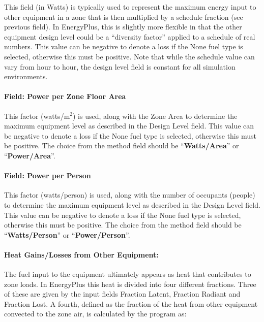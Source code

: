 This field (in Watts) is typically used to represent the maximum energy input to other equipment in a zone that is then multiplied by a schedule fraction (see previous field). In EnergyPlus, this is slightly more flexible in that the other equipment design level could be a ``diversity factor'' applied to a schedule of real numbers. This value can be negative to denote a loss if the None fuel type is selected, otherwise this must be positive. Note that while the schedule value can vary from hour to hour, the design level field is constant for all simulation environments.

\paragraph{Field: Power per Zone Floor Area}\label{field-power-per-zone-floor-area-3}

This factor (watts/m\(^{2}\)) is used, along with the Zone Area to determine the maximum equipment level as described in the Design Level field. This value can be negative to denote a loss if the None fuel type is selected, otherwise this must be positive. The choice from the method field should be ``\textbf{Watts/Area}'' or ``\textbf{Power/Area}''.

\paragraph{Field: Power per Person}\label{field-power-per-person-3}

This factor (watts/person) is used, along with the number of occupants (people) to determine the maximum equipment level as described in the Design Level field. This value can be negative to denote a loss if the None fuel type is selected, otherwise this must be positive. The choice from the method field should be ``\textbf{Watts/Person}'' or ``\textbf{Power/Person}''.

\paragraph{Heat Gains/Losses from Other Equipment:}\label{heat-gainslosses-from-other-equipment}

The fuel input to the equipment ultimately appears as heat that contributes to zone loads. In EnergyPlus this heat is divided into four different fractions. Three of these are given by the input fields Fraction Latent, Fraction Radiant and Fraction Lost. A fourth, defined as the fraction of the heat from other equipment convected to the zone air, is calculated by the program as:

